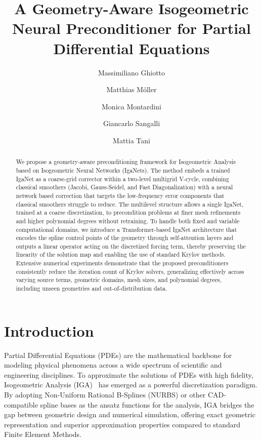 \documentclass{article}
\title{A Geometry-Aware Isogeometric Neural Preconditioner for Partial Differential Equations}
\date{}
\author[1]{Massimiliano Ghiotto}
\author[2]{Matthias M\"oller}
\author[1]{Monica Montardini}
\author[1]{Giancarlo Sangalli}
\author[1]{Mattia Tani}
\affil[1]{Department of Mathematics, University of Pavia}
\affil[2]{Applied Mathematics, Delft University of Technology}
\theoremstyle{plain}
\numberwithin{equation}{section}
\begin{document}
\maketitle
\linenumbers
\begin{abstract}
    We propose a geometry-aware preconditioning framework for Isogeometric Analysis based on Isogeometric Neural Networks (IgaNets). The method embeds a trained IgaNet as a coarse-grid corrector within a two-level multigrid V-cycle, combining classical smoothers (Jacobi, Gauss-Seidel, and Fast Diagonalization) with a neural network based correction that targets the low-frequency error components that classical smoothers struggle to reduce. The multilevel structure allows a single IgaNet, trained at a coarse discretization, to precondition problems at finer mesh refinements and higher polynomial degrees without retraining. To handle both fixed and variable computational domains, we introduce a Transformer-based IgaNet architecture that encodes the spline control points of the geometry through self-attention layers and outputs a linear operator acting on the discretized forcing term, thereby preserving the linearity of the solution map and enabling the use of standard Krylov methods. Extensive numerical experiments demonstrate that the proposed preconditioners consistently reduce the iteration count of Krylov solvers, generalizing effectively across varying source terms, geometric domains, mesh sizes, and polynomial degrees, including unseen geometries and out-of-distribution data.
\end{abstract}

\section{Introduction} \label{sec:introduction}
Partial Differential Equations (PDEs) are the mathematical backbone for modeling physical phenomena across a wide spectrum of scientific and engineering disciplines.
To approximate the solutions of PDEs with high fidelity, Isogeometric Analysis (IGA)~\cite{hughes2005isogeometric} has emerged as a powerful discretization paradigm. By adopting Non-Uniform Rational B-Splines (NURBS) or other CAD-compatible spline bases as the ansatz functions for the analysis, IGA bridges the gap between geometric design and numerical simulation, offering exact geometric representation and superior approximation properties compared to standard Finite Element Methods.
\end{document}
